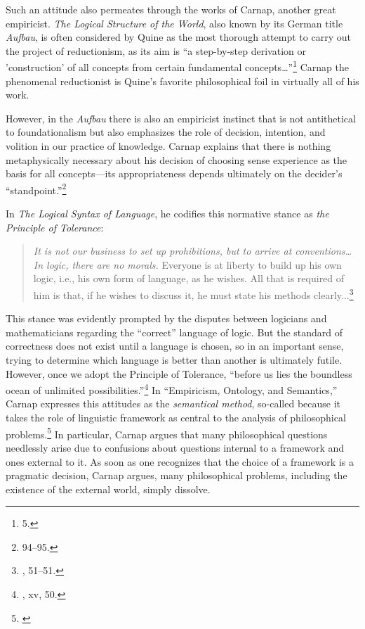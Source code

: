 Such an attitude also permeates through the works of Carnap, another
great empiricist. \emph{The Logical Structure of the World}, also known
by its German title \emph{Aufbau}, is often considered by Quine as the
most thorough attempt to carry out the project of reductionism, as its
aim is ``a step-by-step derivation or 'construction' of all concepts
from certain fundamental concepts\ldots{}''\footnote{\cite{aufbau} 5.}
Carnap the phenomenal reductionist is Quine's favorite philosophical
foil in virtually all of his work.

However, in the \emph{Aufbau} there is also an empiricist instinct that
is not antithetical to foundationalism but also emphasizes the role of
decision, intention, and volition in our practice of knowledge. Carnap explains that there
is nothing metaphysically necessary about his decision of choosing sense experience as the basis for all concepts---its
appropriateness depends ultimately on the decider's
``standpoint.''\footnote{\cite{aufbau} 94--95.}

In \emph{The Logical Syntax of Language}, he codifies this normative
stance as \emph{the Principle of Tolerance}:

\begin{quote}
\emph{It is not our business to set up prohibitions, but to arrive at conventions\ldots{} In logic, there are no morals.} Everyone is at liberty to build up his own logic, i.e., his own form of language, as he wishes. All that is required of him is that, if he wishes to discuss it, he must state his methods clearly...\footnote{\cite{logicalsyntax}, 51--51.}
\end{quote}

This stance was evidently prompted by the disputes between logicians and
mathematicians regarding the ``correct'' language of logic. But the
standard of correctness does not exist until a language is chosen, so in
an important sense, trying to determine which language is better than
another is ultimately futile. However, once we adopt the Principle of
Tolerance, ``before us lies the boundless ocean of unlimited
possibilities.''\footnote{\cite{logicalsyntax}, xv, 50.} In ``Empiricism, Ontology, and Semantics,'' Carnap expresses this attitudes as the \emph{semantical method}, so-called because it takes the role of linguistic framework as central to the analysis of philosophical problems.\footnote{\cite{carnapsemantic}} In particular, Carnap argues that many philosophical questions needlessly arise due to confusions about questions internal to a framework and ones external to it. As soon as one recognizes that the choice of a framework is a pragmatic decision, Carnap argues, many philosophical problems, including the existence of the external world, simply dissolve.  

